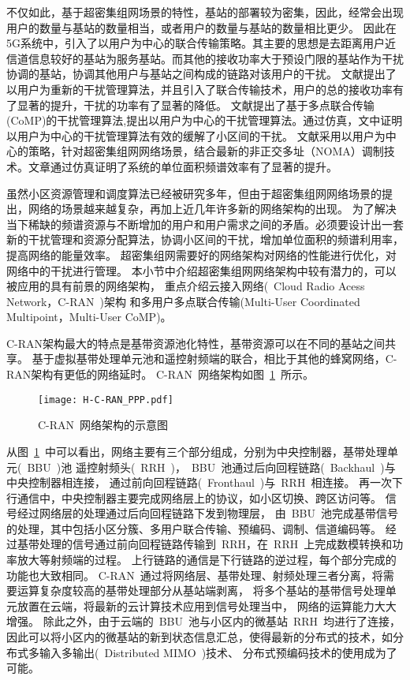 不仅如此，基于超密集组网场景的特性，基站的部署较为密集，因此，经常会出现用户的数量与基站的数量相当，或者用户的数量与基站的数量相比更少。
因此在5G系统中，引入了以用户为中心的联合传输策略。其主要的思想是去距离用户近信道信息较好的基站为服务基站。而其他的接收功率大于预设门限的基站作为干扰协调的基站，协调其他用户与基站之间构成的链路对该用户的干扰。
文献\cite{Ucent}提出了以用户为重新的干扰管理算法，并且引入了联合传输技术，用户的总的接收功率有了显著的提升，干扰的功率有了显著的降低。
文献\cite{CoMPUDN}提出了基于多点联合传输(CoMP)的干扰管理算法,提出以用户为中心的干扰管理算法。通过仿真，文中证明以用户为中心的干扰管理算法有效的缓解了小区间的干扰。
文献\cite{UNOMAcent}采用以用户为中心的策略，针对超密集组网网络场景，结合最新的非正交多址（NOMA）调制技术。文章通过仿真证明了系统的单位面积频谱效率有了显著的提升。

虽然小区资源管理和调度算法已经被研究多年，但由于超密集组网网络场景的提出，网络的场景越来越复杂，再加上近几年许多新的网络架构的出现。
为了解决当下稀缺的频谱资源与不断增加的用户和用户需求之间的矛盾。必须要设计出一套新的干扰管理和资源分配算法，协调小区间的干扰，增加单位面积的频谱利用率，提高网络的能量效率。
超密集组网需要好的网络架构对网络的性能进行优化，对网络中的干扰进行管理。
本小节中介绍超密集组网网络架构中较有潜力的，可以被应用的具有前景的网络架构，
重点介绍云接入网络(~Cloud Radio Acess Network，C-RAN~)架构
和多用户多点联合传输(Multi-User Coordinated Multipoint，Multi-User CoMP)。

C-RAN架构最大的特点是基带资源池化特性，基带资源可以在不同的基站之间共享。
基于虚拟基带处理单元池和遥控射频端的联合，相比于其他的蜂窝网络，C-RAN架构有更低的网络延时。
C-RAN~网络架构如图~\ref{C-RAN}~所示。
\begin{figure}[htbp]
\centering
\texttt{[image: H-C-RAN\_PPP.pdf]}
\caption{C-RAN~网络架构的示意图}\vspace{-1.5em}
\label{C-RAN}
\end{figure}
从图~\ref{C-RAN}~中可以看出，网络主要有三个部分组成，分别为中央控制器，基带处理单元(~BBU~)池
遥控射频头(~RRH~)，~BBU~池通过后向回程链路(~Backhaul~)与中央控制器相连接，
通过前向回程链路(~Fronthaul~)与~RRH~相连接。
再一次下行通信中，中央控制器主要完成网络层上的协议，如小区切换、跨区访问等。
信号经过网络层的处理通过后向回程链路下发到物理层，
由~BBU~池完成基带信号的处理，其中包括小区分簇、多用户联合传输、预编码、调制、信道编码等。
经过基带处理的信号通过前向回程链路传输到~RRH，在~RRH~上完成数模转换和功率放大等射频端的过程。
上行链路的通信是下行链路的逆过程，每个部分完成的功能也大致相同。
C-RAN~通过将网络层、基带处理、射频处理三者分离，将需要运算复杂度较高的基带处理部分从基站端剥离，
将多个基站的基带信号处理单元放置在云端，将最新的云计算技术应用到信号处理当中，
网络的运算能力大大增强。
除此之外，由于云端的~BBU~池与小区内的微基站~RRH~均进行了连接，
因此可以将小区内的微基站的新到状态信息汇总，使得最新的分布式的技术，如分布式多输入多输出(~Distributed MIMO~)技术、
分布式预编码技术的使用成为了可能。


